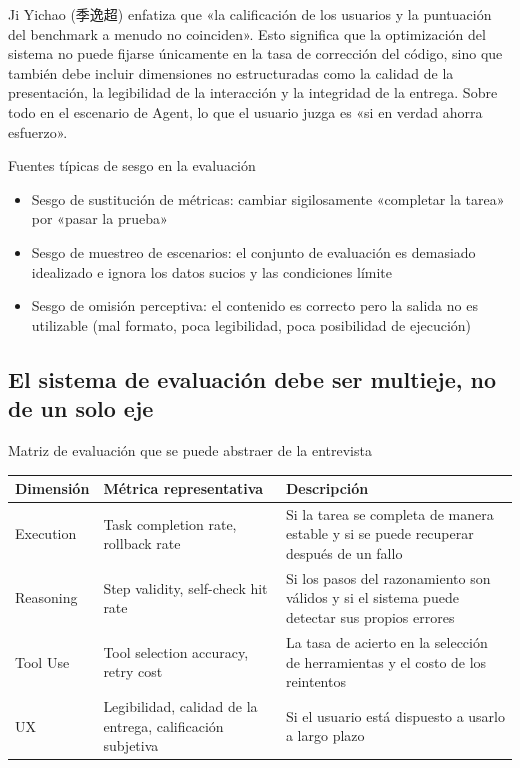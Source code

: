 \documentclass[a4paper]{article}
\begin{document}
Ji Yichao (季逸超) enfatiza que «la calificación de los usuarios y la puntuación del benchmark a menudo no coinciden». Esto significa que la optimización del sistema no puede fijarse únicamente en la tasa de corrección del código, sino que también debe incluir dimensiones no estructuradas como la calidad de la presentación, la legibilidad de la interacción y la integridad de la entrega. Sobre todo en el escenario de Agent, lo que el usuario juzga es «si en verdad ahorra esfuerzo».

\begin{warningbox}{Fuentes típicas de sesgo en la evaluación}
\begin{itemize}
    \item Sesgo de sustitución de métricas: cambiar sigilosamente «completar la tarea» por «pasar la prueba»
    \item Sesgo de muestreo de escenarios: el conjunto de evaluación es demasiado idealizado e ignora los datos sucios y las condiciones límite
    \item Sesgo de omisión perceptiva: el contenido es correcto pero la salida no es utilizable (mal formato, poca legibilidad, poca posibilidad de ejecución)
\end{itemize}
\end{warningbox}

\subsection{El sistema de evaluación debe ser multieje, no de un solo eje}

\begin{importantbox}{Matriz de evaluación que se puede abstraer de la entrevista}
\begin{center}
\begin{tabular}{p{3cm}p{4.2cm}p{6.3cm}}
\toprule
Dimensión & Métrica representativa & Descripción \\
\midrule
Execution & Task completion rate, rollback rate & Si la tarea se completa de manera estable y si se puede recuperar después de un fallo \\
Reasoning & Step validity, self-check hit rate & Si los pasos del razonamiento son válidos y si el sistema puede detectar sus propios errores \\
Tool Use & Tool selection accuracy, retry cost & La tasa de acierto en la selección de herramientas y el costo de los reintentos \\
UX & Legibilidad, calidad de la entrega, calificación subjetiva & Si el usuario está dispuesto a usarlo a largo plazo \\
\bottomrule
\end{tabular}
\end{center}
\end{importantbox}
\end{document}
